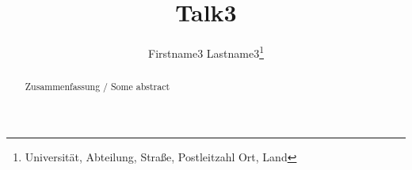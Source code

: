 \documentclass[]{lni}
\begin{document}
\title{Talk3}
\author[Firstname3 Lastname3]
{Firstname3 Lastname3\footnote{Universität, Abteilung, Straße, Postleitzahl Ort,
Land }}
\maketitle

\begin{abstract}
Zusammenfassung / Some abstract
\end{abstract}
\blinddocument
\end{document}
